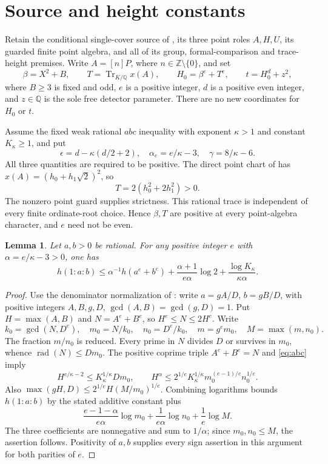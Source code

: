 \documentclass[11pt,a4paper]{article}
\newtheorem{lemma}[theorem]{Lemma}
\newcommand{\Q}{\mathbb Q}\newcommand{\Z}{\mathbb Z}
\DeclareMathOperator{\rad}{rad}
\begin{document}
\section{Source and height constants}
Retain the conditional single-cover source of \cite{Single}, its
three point roles $A,H,U$, its guarded finite point algebra, and all
of its group, formal-comparison and trace-height premises. Write
$A=[n]P$, where $n\in\Z\setminus\{0\}$, and set
\[
 \beta=X^2+B,\qquad T=\operatorname{Tr}_{K/\Q}x(A),\qquad
 H_0=\beta^e+T^e,\qquad t=H_0^d+z^2,
\]
where $B\ge3$ is fixed and odd, $e$ is a positive integer, $d$ is
a positive even integer,
and $z\in\Q$ is the sole free detector parameter.
There are no new coordinates for $H_0$ or $t$.

Assume the fixed weak rational $abc$ inequality with exponent
$\kappa>1$ and constant $K_\kappa\ge1$, and put
\[
 \epsilon=d-\kappa(d/2+2),\quad
 \alpha_e=e/\kappa-3,\quad
 \gamma=8/\kappa-6.
\]
All three quantities are required to be positive. The direct point
chart of \cite[Section 3]{Conditional} has
$x(A)=(h_0+h_1\sqrt2)^2$, so
\begin{equation}\label{eq:positiveT}
 T=2(h_0^2+2h_1^2)>0.
\end{equation}
The nonzero point guard supplies strictness. This rational trace is
independent of every finite ordinate-root choice. Hence $\beta,T$ are
positive at every point-algebra character, and $e$ need not be even.

\begin{lemma}\label{lem:positivepowers}
Let $a,b>0$ be rational. For any positive integer $e$ with
$\alpha=e/\kappa-3>0$, one has
\[
 h(1:a:b)\le\alpha^{-1}h(a^e+b^e)
 +\frac{\alpha+1}{e\alpha}\log2
 +\frac{\log K_\kappa}{\kappa\alpha}.
\]
\end{lemma}
\begin{proof}
Use the denominator normalization of \cite[Lemma 2.2]{Conditional}:
write $a=gA/D$, $b=gB/D$, with positive integers $A,B,g,D$,
$\gcd(A,B)=\gcd(g,D)=1$. Put $H=\max(A,B)$ and
$N=A^e+B^e$, so $H^e\le N\le2H^e$. Write
\[
 k_0=\gcd(N,D^e),\quad m_0=N/k_0,\quad n_0=D^e/k_0,
 \quad m=g^em_0,\quad M=\max(m,n_0).
\]
The fraction $m/n_0$ is reduced. Every prime in $N$ divides $D$
or survives in $m_0$, whence $\rad(N)\le Dm_0$. The positive
coprime triple $A^e+B^e=N$ and \eqref{eq:abc} imply
\[
 H^{e/\kappa-2}\le K_\kappa^{1/\kappa}Dm_0,
 \qquad
 H^\alpha\le2^{1/e}K_\kappa^{1/\kappa}
               m_0^{(e-1)/e}n_0^{1/e}.
\]
Also $\max(gH,D)\le2^{1/e}H(M/m_0)^{1/e}$.
Combining logarithms bounds $h(1:a:b)$ by the stated additive
constant plus
\[
 \frac{e-1-\alpha}{e\alpha}\log m_0
 +\frac1{e\alpha}\log n_0+\frac1e\log M.
\]
The three coefficients are nonnegative and sum to $1/\alpha$;
since $m_0,n_0\le M$, the assertion follows. Positivity of $a,b$
supplies every sign assertion in this argument for both parities of $e$.
\end{proof}
\end{document}

